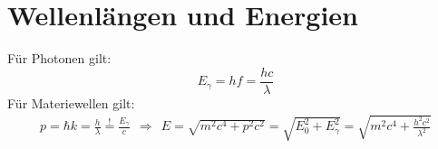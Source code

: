 \documentclass[a4paper,12pt]{article}
\begin{document}
\section{Wellenlängen und Energien}
Für Photonen gilt:
$$E_\gamma=hf=\frac{hc}{\lambda}$$
Für Materiewellen gilt:
\begin{align*}
p = \hbar k=\frac{h}{\lambda}\overset{!}{=}\frac{E_\gamma}{c}\ \ \Rightarrow\ \ E=\sqrt{m^2c^4+p^2c^2}=\sqrt{E_0^2+E_\gamma^2}=\sqrt{m^2c^4+\frac{h^2c^2}{\lambda^2}}
\end{align*}
\end{document}
